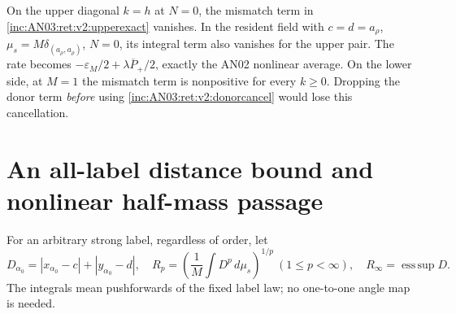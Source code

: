 \documentclass[11pt]{article}
\numberwithin{equation}{section}
\theoremstyle{remark}\newtheorem{remark}[theorem]{Remark}
\newcommand{\dd}{\,d}
\newcommand{\1}{\mathbf 1}
\begin{document}
On the upper diagonal $k=h$ at $N=0$, the mismatch term in
\eqref{inc:AN03:ret:v2:upperexact} vanishes. In the resident field with
$c=d=a_\rho$, $\mu_s=M\delta_{(a_\rho,a_\rho)}$, $N=0$, its integral
term also vanishes for the upper pair. The rate becomes
$-\varepsilon_M/2+\lambda\overline P_+/2$, exactly the AN02 nonlinear
average. On the lower side, at $M=1$ the mismatch term is nonpositive
for every $k\ge0$. Dropping the donor term \emph{before} using
\eqref{inc:AN03:ret:v2:donorcancel} would lose this cancellation.

\section{An all-label distance bound and nonlinear half-mass passage}
\label{inc:AN03:ret:v2:passage}
For an arbitrary strong label, regardless of order, let
\[
 D_{\alpha_0}=|x_{\alpha_0}-c|+|y_{\alpha_0}-d|,
 \quad
 R_p=\left(\frac1M\int D^p\dd\mu_s\right)^{1/p}\ (1\le p<\infty),
 \quad R_\infty=\operatorname*{ess\,sup}D.
\]
The integrals mean pushforwards of the fixed label law; no one-to-one
angle map is needed.
\end{document}
